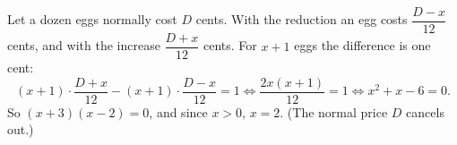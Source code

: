Let a dozen eggs normally cost $D$ cents. With the reduction an egg costs $\dfrac{D-x}{12}$ cents, and with the increase $\dfrac{D+x}{12}$ cents. For $x+1$ eggs the difference is one cent:
\[(x+1)\cdot\dfrac{D+x}{12}-(x+1)\cdot\dfrac{D-x}{12}=1\iff\dfrac{2x(x+1)}{12}=1\iff x^2+x-6=0.\]
So $(x+3)(x-2)=0$, and since $x>0$, $x=\boxed{2}$. (The normal price $D$ cancels out.)
